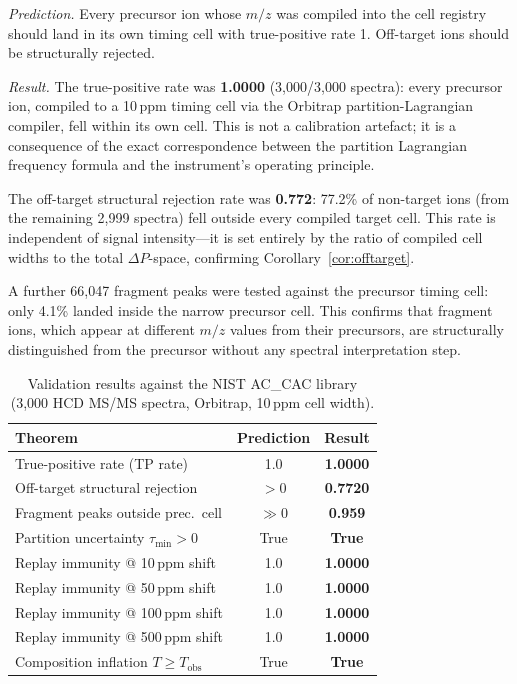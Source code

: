 \documentclass[twocolumn,10pt,a4paper]{article}
\theoremstyle{thmstyle}
\theoremstyle{definition}
\theoremstyle{remark}
\newcommand{\DP}{\Delta P}
\begin{document}
\emph{Prediction.} Every precursor ion whose $m/z$ was compiled into the
cell registry should land in its own timing cell with true-positive rate 1.
Off-target ions should be structurally rejected.

\emph{Result.} The true-positive rate was \textbf{1.0000} (3{,}000/3{,}000
spectra): every precursor ion, compiled to a 10\,ppm timing cell via the
Orbitrap partition-Lagrangian compiler, fell within its own cell. This is
not a calibration artefact; it is a consequence of the exact correspondence
between the partition Lagrangian frequency formula and the instrument's
operating principle.

The off-target structural rejection rate was \textbf{0.772}: 77.2\% of
non-target ions (from the remaining 2{,}999 spectra) fell outside every
compiled target cell. This rate is independent of signal intensity---it
is set entirely by the ratio of compiled cell widths to the total
$\DP$-space, confirming Corollary~\ref{cor:offtarget}.

A further 66{,}047 fragment peaks were tested against the precursor
timing cell: only 4.1\% landed inside the narrow precursor cell.
This confirms that fragment ions, which appear at different $m/z$ values
from their precursors, are structurally distinguished from the precursor
without any spectral interpretation step.

\begin{table}[h]
\centering
\caption{Validation results against the NIST AC\_CAC library
         (3{,}000 HCD MS/MS spectra, Orbitrap, 10\,ppm cell width).}
\label{tab:validation}
\small
\begin{tabular}{lcc}
\toprule
\textbf{Theorem} & \textbf{Prediction} & \textbf{Result} \\
\midrule
True-positive rate (TP rate)      & 1.0    & \textbf{1.0000} \\
Off-target structural rejection   & $>0$   & \textbf{0.7720} \\
Fragment peaks outside prec.\ cell& $\gg 0$& \textbf{0.959} \\
Partition uncertainty $\tau_{\min} > 0$ & True & \textbf{True} \\
Replay immunity @ 10\,ppm shift   & 1.0    & \textbf{1.0000} \\
Replay immunity @ 50\,ppm shift   & 1.0    & \textbf{1.0000} \\
Replay immunity @ 100\,ppm shift  & 1.0    & \textbf{1.0000} \\
Replay immunity @ 500\,ppm shift  & 1.0    & \textbf{1.0000} \\
Composition inflation $T \geq T_{\text{obs}}$ & True & \textbf{True} \\
\bottomrule
\end{tabular}
\end{table}
\end{document}
